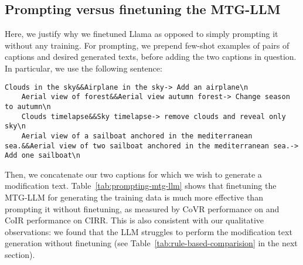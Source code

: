 \subsection{Prompting versus finetuning the MTG-LLM}
\label{app:subsec:llm}
Here, we justify why we finetuned Llama as opposed to simply prompting it
without any training. 
For prompting, we prepend few-shot examples of pairs of captions and desired generated texts, before 
adding the two captions in question. 
In particular, we use the following sentence:
\begin{lstlisting}[breaklines, backgroundcolor = \color{backcolour}]
    Clouds in the sky&&Airplane in the sky-> Add an airplane\n
    Aerial view of forest&&Aerial view autumn forest-> Change season to autumn\n
    Clouds timelapse&&Sky timelapse-> remove clouds and reveal only sky\n
    Aerial view of a sailboat anchored in the mediterranean sea.&&Aerial view of two sailboat anchored in the mediterranean sea.-> Add one sailboat\n
\end{lstlisting}
Then, we concatenate our two captions for which we wish to generate a modification text.
Table~\ref{tab:prompting-mtg-llm} shows that finetuning the MTG-LLM for generating the training data is much more effective than prompting it without finetuning, as measured by CoVR performance on \ourDSm and CoIR performance on CIRR. 
This is also consistent with our qualitative observations: we found that the LLM struggles to perform the modification text generation without finetuning (see Table~\ref{tab:rule-based-comparision} in the next section).


\begin{table}\caption{\textbf{Prompting versus finetuning LLM:} 
    \label{tab:prompting-mtg-llm}
    We compare our finetuned model (MTG-LLM) to a prompting baseline (see Section~\ref{app:subsec:llm}) and observe important gains in the downstream performance of the model trained on the generated data.
    }
    \centering
\end{table}


